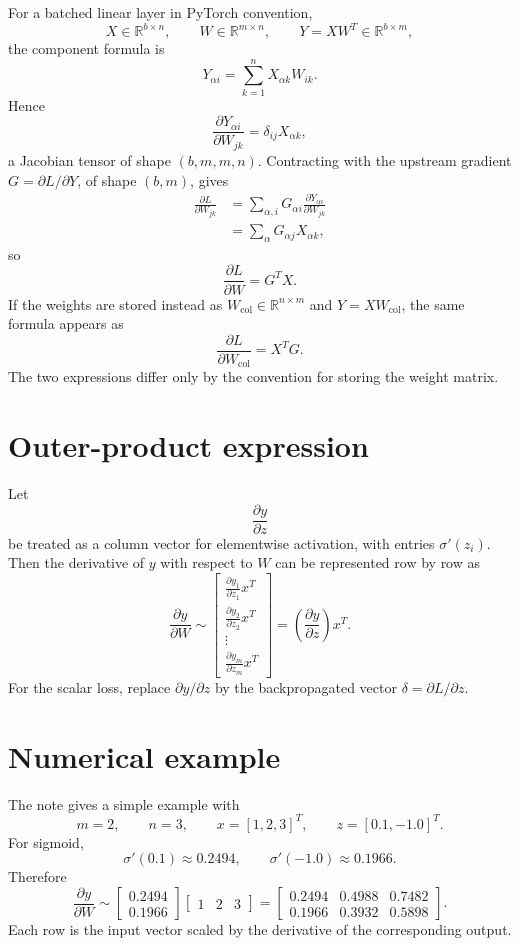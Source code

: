 For a batched linear layer in PyTorch convention,
\[
  X\in\mathbb R^{b\times n},\qquad
  W\in\mathbb R^{m\times n},\qquad
  Y=XW^T\in\mathbb R^{b\times m},
\]
the component formula is
\[
  Y_{\alpha i}=\sum_{k=1}^n X_{\alpha k}W_{ik}.
\]
Hence
\[
  \frac{\partial Y_{\alpha i}}{\partial W_{jk}}
  =
  \delta_{ij}X_{\alpha k},
\]
a Jacobian tensor of shape \((b,m,m,n)\).  Contracting with the upstream gradient \(G=\partial L/\partial Y\), of shape \((b,m)\), gives
\[
\begin{aligned}
  \frac{\partial L}{\partial W_{jk}}
  &=
  \sum_{\alpha,i}G_{\alpha i}
  \frac{\partial Y_{\alpha i}}{\partial W_{jk}}\\
  &=
  \sum_{\alpha}G_{\alpha j}X_{\alpha k},
\end{aligned}
\]
so
\[
  \frac{\partial L}{\partial W}=G^TX.
\]
If the weights are stored instead as \(W_{\mathrm{col}}\in\mathbb R^{n\times m}\) and \(Y=XW_{\mathrm{col}}\), the same formula appears as
\[
  \frac{\partial L}{\partial W_{\mathrm{col}}}=X^TG.
\]
The two expressions differ only by the convention for storing the weight matrix.

\section{Outer-product expression}

Let
\[
  \frac{\partial y}{\partial z}
\]
be treated as a column vector for elementwise activation, with entries $\sigma'(z_i)$.  Then the derivative of $y$ with respect to $W$ can be represented row by row as
\[
  \frac{\partial y}{\partial W}\sim
  \begin{bmatrix}
  \frac{\partial y_1}{\partial z_1}x^T\\
  \frac{\partial y_2}{\partial z_2}x^T\\
  \vdots\\
  \frac{\partial y_m}{\partial z_m}x^T
  \end{bmatrix}
  =\left(\frac{\partial y}{\partial z}\right)x^T.
\]
For the scalar loss, replace $\partial y/\partial z$ by the backpropagated vector $\delta=\partial L/\partial z$.

\section{Numerical example}

The note gives a simple example with
\[
  m=2,\qquad n=3,\qquad x=[1,2,3]^T,\qquad z=[0.1,-1.0]^T.
\]
For sigmoid,
\[
  \sigma'(0.1)\approx0.2494,\qquad
  \sigma'(-1.0)\approx0.1966.
\]
Therefore
\[
  \frac{\partial y}{\partial W}\sim
  \begin{bmatrix}0.2494\\0.1966\end{bmatrix}
  \begin{bmatrix}1&2&3\end{bmatrix}
  =
  \begin{bmatrix}
  0.2494&0.4988&0.7482\\
  0.1966&0.3932&0.5898
  \end{bmatrix}.
\]
Each row is the input vector scaled by the derivative of the corresponding output.

